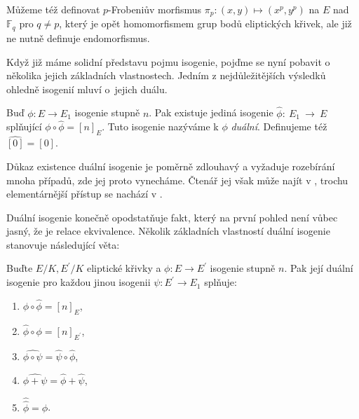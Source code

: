 \documentclass[12pt]{report}
\begin{document}
Můžeme též definovat $p$-Frobeniův morfismus $\pi_p : (x,y) \mapsto (x^p,y^p)$ na $E$ nad $\mathbb{F}_q$ pro $q \neq p$, který je opět homomorfismem grup bodů eliptických křivek, ale již ne nutně definuje endomorfismus.

Když již máme solidní představu pojmu isogenie, pojďme se nyní pobavit o několika jejich základních vlastnostech. Jedním z nejdůležitějších výsledků ohledně isogenií mluví o~jejich duálu.

\begin{veta}
Buď $\phi: E \longrightarrow E_1$ isogenie stupně $n$. Pak existuje jediná isogenie $\hat{\phi}:~E_1~\longrightarrow~E$ splňující $\phi \circ \hat{\phi} = [n]_E$. Tuto isogenie nazýváme k $\phi$ \textit{duální}. Definujeme též $\hat{[0]} = [0]$.
\end{veta}
Důkaz existence duální isogenie je poměrně zdlouhavý a vyžaduje rozebírání mnoha případů, zde jej proto vynecháme. Čtenář jej však může najít v \cite[Thm. III.6.1.]{Silverman}, trochu elementárnější přístup se nachází v \cite[Thm. 7.8.]{Sutherland}.

Duální isogenie konečně opodstatňuje fakt, který na první pohled není vůbec jasný, že  je relace ekvivalence. Několik základních vlastností duální isogenie stanovuje následující věta:

\begin{veta}\label{dual}
Buďte $E/K,E^\prime/K$ eliptické křivky a $\phi: E \longrightarrow E^\prime$ isogenie stupně $n$. Pak její duální isogenie pro každou jinou isogenii $\psi:E^\prime \longrightarrow E_1$ splňuje:
\begin{enumerate}
\item $\phi \circ \hat{\phi} = [n]_E$,
\item $\hat{\phi} \circ \phi = [n]_{E^\prime}$,
\item $\widehat{\phi \circ \psi} = \hat{\psi} \circ \hat{\phi}$,
\item $\widehat{\phi + \psi} = \hat{\phi} + \hat{\psi}$,
\item $\hat{\hat{\phi} } = \phi $.
\end{enumerate} 
\end{veta}
\end{document}
